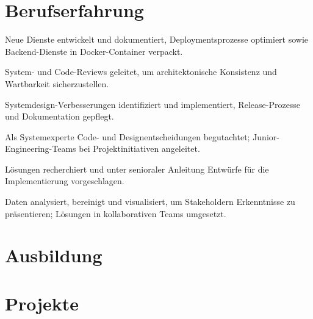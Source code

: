 \documentclass[11pt,a4paper]{resume}
\begin{document}
\section{Berufserfahrung}

\bullets
  \item Neue Dienste entwickelt und dokumentiert, Deploymentsprozesse optimiert sowie Backend-Dienste in Docker-Container verpackt.
  \item System- und Code-Reviews geleitet, um architektonische Konsistenz und Wartbarkeit sicherzustellen.
\bulletsend
\vspace{3pt}
\bullets
  \item Systemdesign-Verbesserungen identifiziert und implementiert, Release-Prozesse und Dokumentation gepflegt.
  \item Als Systemexperte Code- und Designentscheidungen begutachtet; Junior-Engineering-Teams bei Projektinitiativen angeleitet.
\bulletsend
\vspace{3pt}
\bullets
  \item Lösungen recherchiert und unter senioraler Anleitung Entwürfe für die Implementierung vorgeschlagen.
  \item Daten analysiert, bereinigt und visualisiert, um Stakeholdern Erkenntnisse zu präsentieren; Lösungen in kollaborativen Teams umgesetzt.
\bulletsend
\vspace{3pt}

\section{Ausbildung}

\vspace{2pt}

\section{Projekte}
\end{document}
